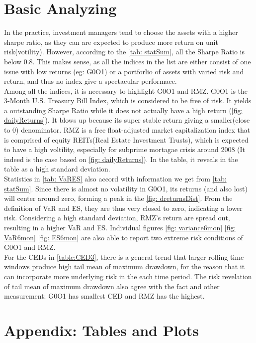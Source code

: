 \documentclass[12pt]{article}
\begin{document}
\section{Basic Analyzing}
In the practice, investment managers tend to choose the assets with a higher sharpe ratio, as they can are expected to produce more return on unit risk(votility). However, according to the \ref{tab: statSum}, all the Sharpe Ratio is below 0.8. This makes sense, as all the indices in the list are either consist of one issue with low returns (eg: G0O1) or a portforlio of assets with varied risk and return, and thus no index give a spectacular performace. \\
Among all the indices, it is necessary to highlight G0O1 and RMZ. G0O1 is the 3-Month U.S. Treasury Bill Index, which is considered to be free of risk. It yields a outstanding Sharpe Ratio while it does not actually have a  high return (\ref{fig: dailyReturns}). It blows up because its super stable return giving a smaller(close to 0) denominator. RMZ is a free float-adjusted market capitalization index that is comprised of equity REITs(Real Estate Investment Trusts), which is expected to have a high voltility, especially for subprime mortagae crisis around 2008 (It indeed is the case based on \ref{fig: dailyReturns}). In the table, it reveals in the table as a high standard deviation.\\
Statistics in \ref{tab: VaRES} also accord with information we get from \ref{tab: statSum}. Since there is almost no volatility in G0O1, its returns (and also lost) will center around zero, forming a peak in the \ref{fig: dreturnsDist}. From the definition of VaR and ES, they are thus very closed to zero, indicating a lower risk. Considering a high standard deviation, RMZ's return are spread out, resulting in a higher VaR and ES. Individual figures \ref{fig: variance6mon} \ref{fig: VaR6mon} \ref{fig: ES6mon} are also able to report two extreme risk conditions of G0O1 and RMZ.\\
For the CEDs in \ref{table:CED3}, there is a general trend that larger rolling time windows produce high tail mean of maximum drawdown, for the reason that it can incorporate more underlying risk in the each time period. The risk revelation of tail mean of maximum drawdown also agree with the fact and other measurement: G0O1 has smallest CED and RMZ has the highest.



\section{Appendix: Tables and Plots}
\end{document}
